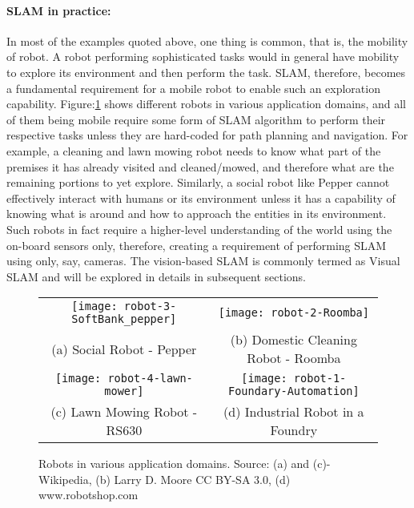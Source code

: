\documentclass{article}
\begin{document}
\paragraph{SLAM in practice:} 
In most of the examples quoted above, one thing is common, that is, the mobility of robot. A robot performing sophisticated tasks would in general have mobility to explore its environment and then perform the task. SLAM, therefore, becomes a fundamental requirement for a mobile robot to enable such an exploration capability. Figure:\ref{fig:robots} shows different robots in various application domains, and all of them being mobile require some form of SLAM algorithm to perform their respective tasks unless they are hard-coded for path planning and navigation. For example, a cleaning and lawn mowing robot needs to know what part of the premises it has already visited and cleaned/mowed, and therefore what are the remaining portions to yet explore. Similarly, a social robot like Pepper cannot effectively interact with humans or its environment unless it has a capability of knowing what is around and how to approach the entities in its environment. Such robots in fact require a higher-level understanding of the world using the on-board sensors only, therefore, creating a requirement of performing SLAM using only, say, cameras. The vision-based SLAM is commonly termed as Visual SLAM and will be explored in details in subsequent sections.

\begin{figure}[htbp]
\centering
 \begin{tabular}{cc}
  \texttt{[image: robot-3-SoftBank\_pepper]} &
  \texttt{[image: robot-2-Roomba]} \\
 (a) Social Robot - Pepper &
  (b) Domestic Cleaning Robot - Roomba \\
  \texttt{[image: robot-4-lawn-mower]} &
  \texttt{[image: robot-1-Foundary-Automation]} \\
  (c) Lawn Mowing Robot - RS630 &
  (d) Industrial Robot in a Foundry \\
 \end{tabular}
 \caption{Robots in various application domains. Source: (a) and (c)- Wikipedia, (b) Larry D. Moore CC BY-SA 3.0, (d) www.robotshop.com }
 \label{fig:robots}
\end{figure}
\end{document}
